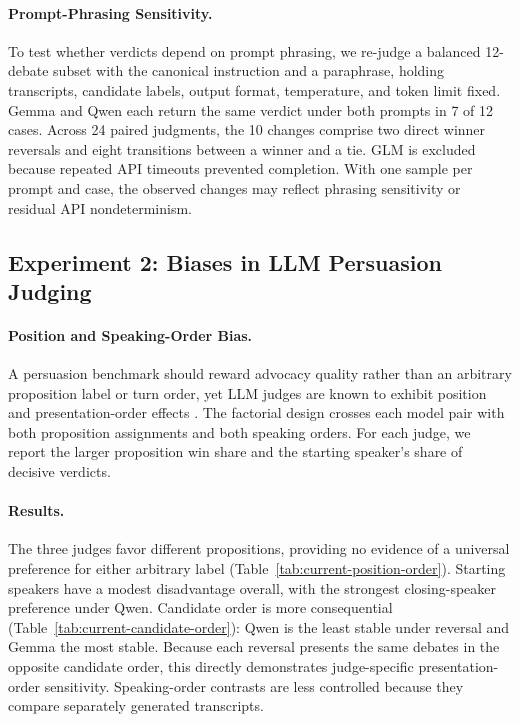 \documentclass{article}
\begin{document}
\paragraph{Prompt-Phrasing Sensitivity.}
To test whether verdicts depend on prompt phrasing, we re-judge a balanced 12-debate subset with the canonical instruction and a paraphrase, holding transcripts, candidate labels, output format, temperature, and token limit fixed. Gemma and Qwen each return the same verdict under both prompts in 7 of 12 cases. Across 24 paired judgments, the 10 changes comprise two direct winner reversals and eight transitions between a winner and a tie. GLM is excluded because repeated API timeouts prevented completion. With one sample per prompt and case, the observed changes may reflect phrasing sensitivity or residual API nondeterminism.

\subsection{Experiment 2: Biases in LLM Persuasion Judging}

\paragraph{Position and Speaking-Order Bias.}
A persuasion benchmark should reward advocacy quality rather than an arbitrary proposition label or turn order, yet LLM judges are known to exhibit position and presentation-order effects \citep{wang2024faireval,shi2024positionbias}. The factorial design crosses each model pair with both proposition assignments and both speaking orders. For each judge, we report the larger proposition win share and the starting speaker's share of decisive verdicts.

\paragraph{Results.}
The three judges favor different propositions, providing no evidence of a universal preference for either arbitrary label (Table~\ref{tab:current-position-order}). Starting speakers have a modest disadvantage overall, with the strongest closing-speaker preference under Qwen. Candidate order is more consequential (Table~\ref{tab:current-candidate-order}): Qwen is the least stable under reversal and Gemma the most stable. Because each reversal presents the same debates in the opposite candidate order, this directly demonstrates judge-specific presentation-order sensitivity. Speaking-order contrasts are less controlled because they compare separately generated transcripts.
\end{document}
